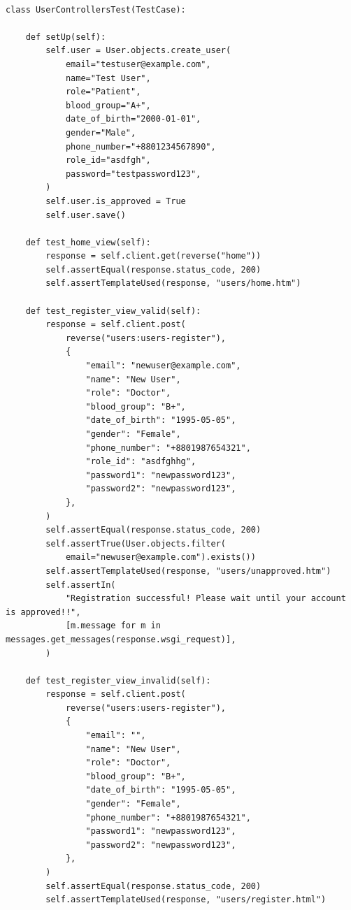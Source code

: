 \documentclass[a4paper,12pt]{article}
\begin{document}
\begin{lstlisting}

class UserControllersTest(TestCase):

    def setUp(self):
        self.user = User.objects.create_user(
            email="testuser@example.com",
            name="Test User",
            role="Patient",
            blood_group="A+",
            date_of_birth="2000-01-01",
            gender="Male",
            phone_number="+8801234567890",
            role_id="asdfgh",
            password="testpassword123",
        )
        self.user.is_approved = True
        self.user.save()

    def test_home_view(self):
        response = self.client.get(reverse("home"))
        self.assertEqual(response.status_code, 200)
        self.assertTemplateUsed(response, "users/home.htm")

    def test_register_view_valid(self):
        response = self.client.post(
            reverse("users:users-register"),
            {
                "email": "newuser@example.com",
                "name": "New User",
                "role": "Doctor",
                "blood_group": "B+",
                "date_of_birth": "1995-05-05",
                "gender": "Female",
                "phone_number": "+8801987654321",
                "role_id": "asdfghhg",
                "password1": "newpassword123",
                "password2": "newpassword123",
            },
        )
        self.assertEqual(response.status_code, 200)
        self.assertTrue(User.objects.filter(
            email="newuser@example.com").exists())
        self.assertTemplateUsed(response, "users/unapproved.htm")
        self.assertIn(
            "Registration successful! Please wait until your account is approved!!",
            [m.message for m in messages.get_messages(response.wsgi_request)],
        )

    def test_register_view_invalid(self):
        response = self.client.post(
            reverse("users:users-register"),
            {
                "email": "",
                "name": "New User",
                "role": "Doctor",
                "blood_group": "B+",
                "date_of_birth": "1995-05-05",
                "gender": "Female",
                "phone_number": "+8801987654321",
                "password1": "newpassword123",
                "password2": "newpassword123",
            },
        )
        self.assertEqual(response.status_code, 200)
        self.assertTemplateUsed(response, "users/register.html")

\end{lstlisting}
\end{document}
